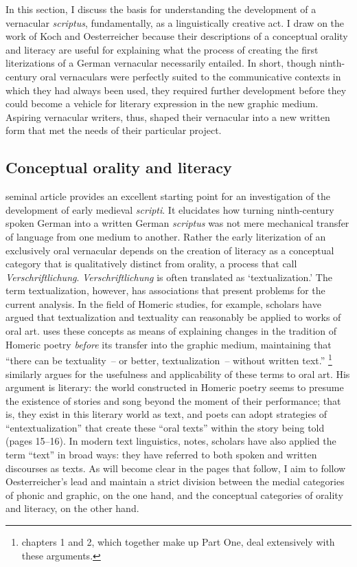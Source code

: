 In this section, I discuss the basis for understanding the development of a vernacular \textit{scriptus}, fundamentally, as a linguistically creative act. I draw on the work of Koch and Oesterreicher because their descriptions of a conceptual orality and literacy are useful for explaining what the process of creating the first literizations of a German vernacular necessarily entailed. In short, though ninth-century oral vernaculars were perfectly suited to the communicative contexts in which they had always been used, they required further development before they could become a vehicle for literary expression in the new graphic medium. Aspiring vernacular writers, thus, shaped their vernacular into a new written form that met the needs of their particular project.

\subsection{Conceptual orality and literacy}\label{sec:3:3.2.1}

 seminal article provides an excellent starting point for an investigation of the development of early medieval \textit{scripti}. It elucidates how turning ninth-century spoken German into a written German \textit{scriptus} was not mere mechanical transfer of language from one medium to another. Rather the early literization of an exclusively oral vernacular depends on the creation of literacy as a conceptual category that is qualitatively distinct from orality, a process that \citet{KochOesterreicher1994} call \textit{Verschriftlichung}. \textit{Verschriftlichung} is often translated as ‘textualization.’ The term textualization, however, has associations that present problems for the current analysis. In the field of Homeric studies, for example, scholars have argued that textualization and textuality can reasonably be applied to works of oral art. \citet[109]{Nagy1996} uses these concepts as means of explaining changes in the tradition of Homeric poetry \textit{before} its transfer into the graphic medium, maintaining that “there can be textuality~-- or better, textualization~-- without written text.” \citet{Ready2019}\footnote{ chapters 1 and 2, which together make up Part One, deal extensively with these arguments.} similarly argues for the usefulness and applicability of these terms to oral art. His argument is literary: the world constructed in Homeric poetry seems to presume the existence of stories and song beyond the moment of their performance; that is, they exist in this literary world as text, and poets can adopt strategies of “entextualization” that create these “oral texts” within the story being told (pages 15--16). In modern text linguistics, \citet[191]{Oesterreicher1997} notes, scholars have also applied the term “text” in broad ways: they have referred to both spoken and written discourses as texts. As will become clear in the pages that follow, I aim to follow Oesterreicher’s lead and maintain a strict division between the medial categories of phonic and graphic, on the one hand, and the conceptual categories of orality and literacy, on the other hand.

